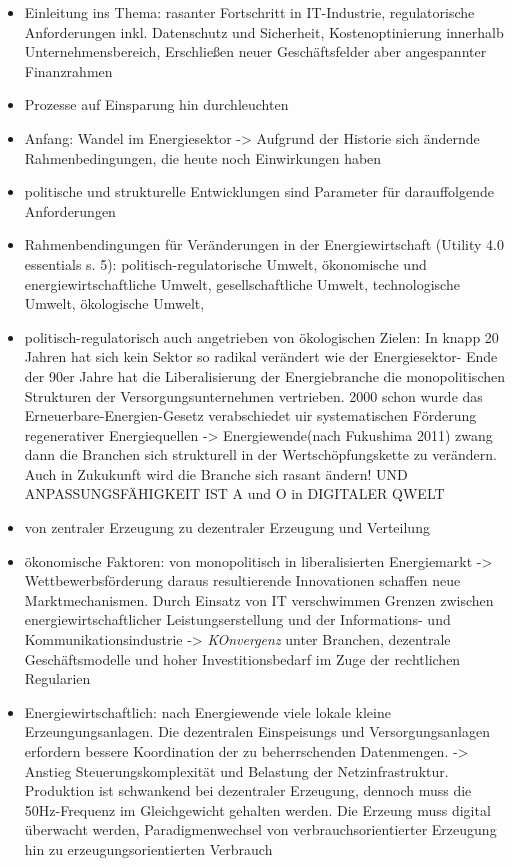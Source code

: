 \begin{itemize}
  \item Einleitung ins Thema: rasanter Fortschritt in IT-Industrie, regulatorische Anforderungen inkl. Datenschutz und Sicherheit, Kostenoptinierung innerhalb Unternehmensbereich, Erschließen neuer Geschäftsfelder aber angespannter Finanzrahmen
  \item Prozesse auf Einsparung hin durchleuchten
  \item Anfang: Wandel im Energiesektor -> Aufgrund der Historie sich ändernde Rahmenbedingungen, die heute noch Einwirkungen haben
  \item politische und strukturelle Entwicklungen sind Parameter für darauffolgende Anforderungen
  \item Rahmenbendingungen für Veränderungen in der Energiewirtschaft (Utility 4.0 essentials s. 5): politisch-regulatorische Umwelt, ökonomische und energiewirtschaftliche Umwelt, gesellschaftliche Umwelt, technologische Umwelt, ökologische Umwelt,
  \item politisch-regulatorisch auch angetrieben von ökologischen Zielen: In knapp 20 Jahren hat sich kein Sektor so radikal verändert wie der Energiesektor- Ende der 90er Jahre hat die Liberalisierung der Energiebranche die monopolitischen Strukturen der Versorgungsunternehmen  vertrieben. 2000 schon wurde das Erneuerbare-Energien-Gesetz verabschiedet uir systematischen Förderung regenerativer Energiequellen -> Energiewende(nach Fukushima 2011) zwang dann die Branchen sich strukturell in der Wertschöpfungskette zu verändern. Auch in Zukukunft wird die Branche sich rasant ändern! UND ANPASSUNGSFÄHIGKEIT IST A und O in DIGITALER QWELT
  \item von zentraler Erzeugung zu dezentraler Erzeugung und Verteilung
  \item ökonomische Faktoren: von monopolitisch in liberalisierten Energiemarkt  -> Wettbewerbsförderung daraus resultierende Innovationen schaffen neue Marktmechanismen. Durch Einsatz von IT verschwimmen Grenzen zwischen energiewirtschaftlicher Leistungserstellung und der Informations- und Kommunikationsindustrie -> \textit{KOnvergenz} unter Branchen, dezentrale Geschäftsmodelle und hoher Investitionsbedarf im Zuge der rechtlichen Regularien
  \item Energiewirtschaftlich: nach Energiewende viele lokale kleine Erzeungungsanlagen. Die dezentralen Einspeisungs und Versorgungsanlagen erfordern bessere Koordination der zu beherrschenden Datenmengen. -> Anstieg Steuerungskomplexität und Belastung der Netzinfrastruktur. Produktion ist schwankend bei dezentraler Erzeugung, dennoch muss die 50Hz-Frequenz im Gleichgewicht gehalten werden. Die Erzeung muss digital überwacht werden, Paradigmenwechsel von verbrauchsorientierter Erzeugung hin zu erzeugungsorientierten Verbrauch

\end{itemize}
